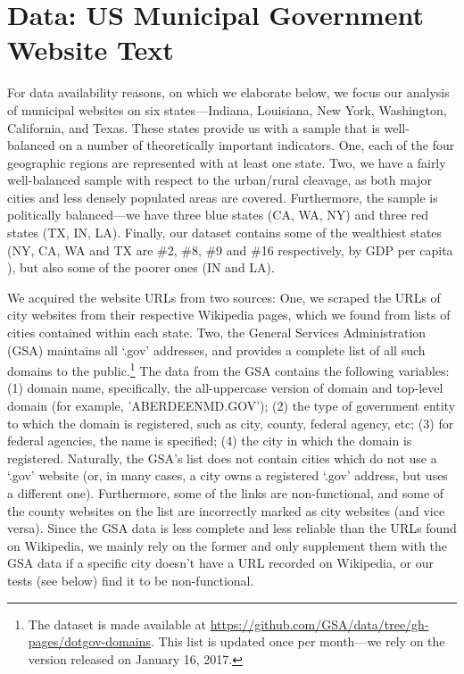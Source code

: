 \documentclass[11pt]{article}
\begin{document}
\section{Data: US Municipal Government Website Text}

For data availability reasons, on which we elaborate below, we focus our analysis of municipal websites on six states---Indiana, Louisiana, New York, Washington, California, and Texas. These states provide us with a sample that is well-balanced on a number of theoretically important indicators. One, each of the four geographic regions are represented with at least one state. Two, we have a fairly well-balanced sample with respect to the urban/rural cleavage, as both major cities and less densely populated areas are covered. Furthermore, the sample is politically balanced---we have three blue states (CA, WA, NY) and three red states (TX, IN, LA). Finally, our dataset contains some of the wealthiest states (NY, CA, WA and TX are \#2, \#8, \#9 and \#16 respectively, by GDP per capita \citep{BureauofEconomicAnalysis2017}), but also some of the poorer ones (IN and LA). 

We acquired the website URLs from two sources: One, we scraped the URLs of city websites from their respective Wikipedia pages, which we found from lists of cities contained within each state. Two, the General Services Administration (GSA) maintains all `.gov' addresses, and provides a complete list of all such domains to the public.\footnote{The dataset is made available at \url{https://github.com/GSA/data/tree/gh-pages/dotgov-domains}. This list is updated once per month---we rely on the version released on January 16, 2017.} The data from the GSA contains the following variables: (1) domain name, specifically, the all-uppercase version of domain and top-level domain (for example, 'ABERDEENMD.GOV'); (2) the type of government entity to which the domain is registered, such as city, county, federal agency, etc; (3) for federal agencies, the name is specified; (4) the city in which the domain is registered. Naturally, the GSA's list does not contain cities which do not use a `.gov' website (or, in many cases, a city owns a registered `.gov' address, but uses a different one). Furthermore, some of the links are non-functional, and some of the county websites on the list are incorrectly marked as city websites (and vice versa). Since the GSA data is less complete and less reliable than the URLs found on Wikipedia, we mainly rely on the former and only supplement them with the GSA data if a specific city doesn't have a URL recorded on Wikipedia, or our tests (see below) find it to be non-functional.
\end{document}
